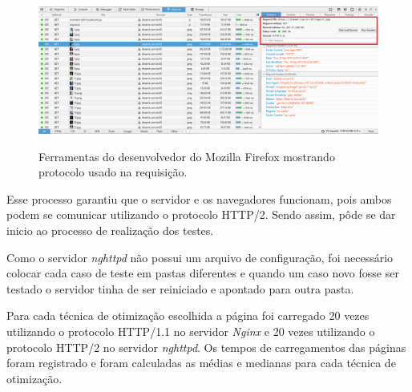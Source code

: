 \begin{figure}[!htb]
    \centering
    \caption{Ferramentas do desenvolvedor do Mozilla Firefox mostrando protocolo usado na requisição.}
    \includegraphics[width=1.0\textwidth]{./04-figuras/desenvolvimento/http2_firefox}
    \label{fig:httpcontenttype2011}
\end{figure}

Esse processo garantiu que o servidor e os navegadores funcionam, pois ambos podem se comunicar utilizando o protocolo HTTP/2. Sendo assim, pôde se dar inicio ao processo de realização dos testes.

Como o servidor \textit{nghttpd} não possui um arquivo de configuração, foi necessário colocar cada caso de teste em pastas diferentes e quando um caso novo fosse ser testado o servidor tinha de ser reiniciado e apontado para outra pasta.

Para cada técnica de otimização escolhida a página foi carregado 20 vezes utilizando o protocolo HTTP/1.1 no servidor \textit{Nginx} e 20 vezes utilizando o protocolo HTTP/2 no servidor \textit{nghttpd}. Os tempos de carregamentos das páginas foram registrado e foram calculadas as médias e medianas para cada técnica de otimização.